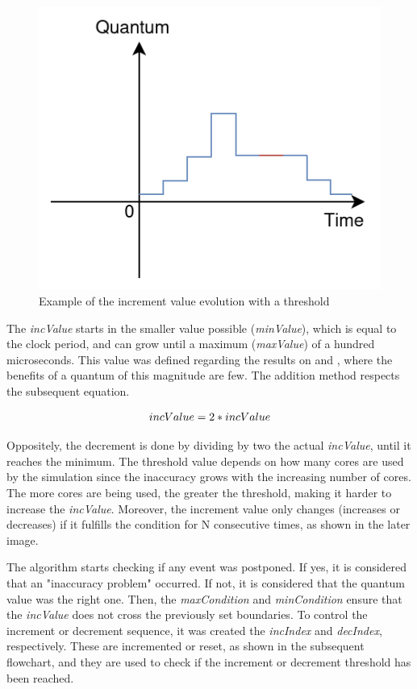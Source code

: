 \begin{figure}[h!]
	\centering
 	\includegraphics[width=0.4\linewidth]{Images/incAlgorithm_graph.png}
 	\caption{Example of the increment value evolution with a threshold}
	 \label{fig_incAlgorithm_graph}
\end{figure}

The \textit{incValue} starts in the smaller value possible (\textit{minValue}), which is equal to the clock period, 
and can grow until a maximum (\textit{maxValue}) of a hundred microseconds.  
This value was defined regarding the results on \cite{pargem5} and \cite{BeyondQuantumTDSim}, where the benefits of a 
quantum of this magnitude are few. The addition method respects the subsequent equation.

\begin{equation}
    \label{eq_incValue}
    \centering
        \Large
        incValue = 2 * incValue
        \normalsize
\end{equation}
\vspace{0.3cm}

Oppositely, the decrement is done by dividing by two the actual \textit{incValue}, until it reaches the minimum. The threshold value depends on how 
many cores are used by the simulation since the inaccuracy grows with the increasing number of cores. The more cores are being used, the greater 
the threshold, making it harder to increase the \textit{incValue}. Moreover, the increment value only changes (increases or decreases) if it 
fulfills the condition for N consecutive times, as shown in the later image. 

The algorithm starts checking if any event 
was postponed. If yes, it is considered that an "inaccuracy problem" occurred. If not, it is considered that the quantum value was the right one.
Then, the \textit{maxCondition} and \textit{minCondition} ensure that the \textit{incValue} does not cross the previously set boundaries. To control the 
increment or decrement sequence, it was created the \textit{incIndex} and \textit{decIndex}, respectively. These are incremented or reset, as 
shown in the subsequent flowchart, and they are used to check if the increment or decrement threshold has been reached.

